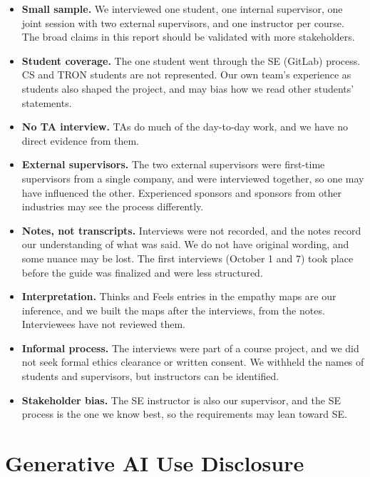 \documentclass{article}
\begin{document}
    \begin{itemize}
        \item \textbf{Small sample.} We interviewed one student, one internal supervisor, one joint session with two
        external supervisors, and one instructor per course. The broad claims in this report should be validated
        with more stakeholders.
        \item \textbf{Student coverage.} The one student went through the SE (GitLab) process. CS and TRON students
        are not represented. Our own team's experience as students also shaped the project, and may bias
        how we read other students' statements.
        \item \textbf{No TA interview.} TAs do much of the day-to-day work, and we have no direct evidence
        from them.
        \item \textbf{External supervisors.} The two external supervisors were first-time supervisors from a
        single company, and were interviewed together, so one may have influenced the other. Experienced sponsors
        and sponsors from other industries may see the process differently.
        \item \textbf{Notes, not transcripts.} Interviews were not recorded, and the notes record our
        understanding of what was said. We do not have original wording, and some nuance may be lost. The
        first interviews (October 1 and 7) took place before the guide was finalized and were less structured.
        \item \textbf{Interpretation.} Thinks and Feels entries in the empathy maps are our inference, and
        we built the maps after the interviews, from the notes. Interviewees have not reviewed them.
        \item \textbf{Informal process.} The interviews were part of a course project, and we did not seek
        formal ethics clearance or written consent. We withheld the names of students and supervisors, but
        instructors can be identified.
        \item \textbf{Stakeholder bias.} The SE instructor is also our supervisor, and the SE process is
        the one we know best, so the requirements may lean toward SE.
    \end{itemize}

    \newpage
    \appendix

    \section{Generative AI Use Disclosure}
    \label{app:ai-use}
\end{document}

